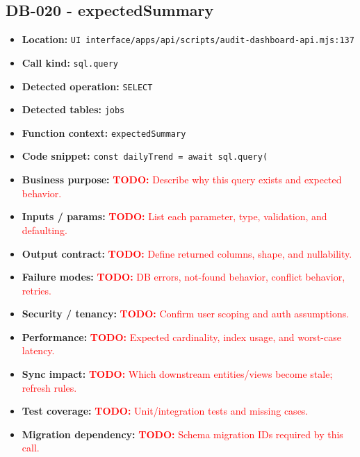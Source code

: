 \documentclass[11pt]{article}
\newcommand{\todoitem}[1]{\textcolor{red}{\textbf{TODO:} #1}}
\begin{document}
\subsection{DB-020 - expectedSummary}
\begin{itemize}[leftmargin=1.5em]
\item \textbf{Location:} \texttt{UI interface/apps/api/scripts/audit-dashboard-api.mjs:137}
\item \textbf{Call kind:} \texttt{sql.query}
\item \textbf{Detected operation:} \texttt{SELECT}
\item \textbf{Detected tables:} \texttt{jobs}
\item \textbf{Function context:} \texttt{expectedSummary}
\item \textbf{Code snippet:} \texttt{const dailyTrend = await sql.query(}
\item \textbf{Business purpose:} \todoitem{Describe why this query exists and expected behavior.}
\item \textbf{Inputs / params:} \todoitem{List each parameter, type, validation, and defaulting.}
\item \textbf{Output contract:} \todoitem{Define returned columns, shape, and nullability.}
\item \textbf{Failure modes:} \todoitem{DB errors, not-found behavior, conflict behavior, retries.}
\item \textbf{Security / tenancy:} \todoitem{Confirm user scoping and auth assumptions.}
\item \textbf{Performance:} \todoitem{Expected cardinality, index usage, and worst-case latency.}
\item \textbf{Sync impact:} \todoitem{Which downstream entities/views become stale; refresh rules.}
\item \textbf{Test coverage:} \todoitem{Unit/integration tests and missing cases.}
\item \textbf{Migration dependency:} \todoitem{Schema migration IDs required by this call.}
\end{itemize}
\end{document}
